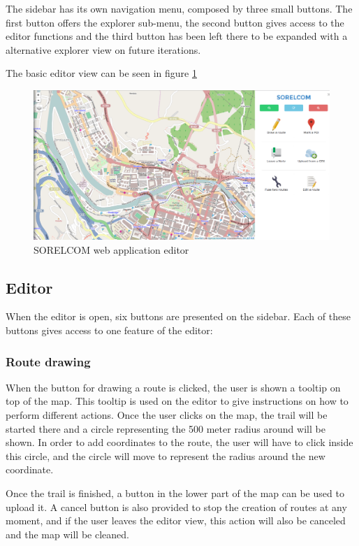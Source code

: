 The sidebar has its own navigation menu, composed by three small buttons. The first button offers the explorer sub-menu, the second button gives access to the editor functions and the third button has been left there to be expanded with a alternative explorer view on future iterations.

The basic editor view can be seen in figure \ref{fig:editor}

\begin{figure}[ht]
  \centering
  \includegraphics[width=.75\textwidth]{fig/map-editor}
  \caption{SORELCOM web application editor}
  \label{fig:editor}
\end{figure}

\subsection{Editor}

When the editor is open, six buttons are presented on the sidebar. Each of these buttons gives access to one feature of the editor:

\subsubsection*{Route drawing}
When the button for drawing a route is clicked, the user is shown a tooltip on top of the map. This tooltip is used on the editor to give instructions on how to perform different actions. Once the user clicks on the map, the trail will be started there and a circle representing the 500 meter radius around will be shown. In order to add coordinates to the route, the user will have to click inside this circle, and the circle will move to represent the radius around the new coordinate.

Once the trail is finished, a button in the lower part of the map can be used to upload it. A cancel button is also provided to stop the creation of routes at any moment, and if the user leaves the editor view, this action will also be canceled and the map will be cleaned.


